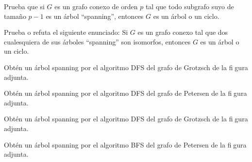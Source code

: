 \documentclass[twoside]{article}
\begin{document}
\newpage

\begin{ejercicio}{1.6}
Prueba que si $G$ es un grafo conexo de orden $p$ tal que todo subgrafo suyo de tamaño
$p -1$ es un árbol ``spanning'', entonces $G$ es un árbol o un ciclo.
\end{ejercicio}
\begin{solucion}
\end{solucion}

\newpage

\begin{ejercicio}{1.7}
Prueba o refuta el siguiente enunciado: Si $G$ es un grafo conexo tal que dos cualesquiera
de sus árboles ``spanning'' son isomorfos, entonces $G$ es un árbol o un ciclo.
\end{ejercicio}
\begin{solucion}

\end{solucion}

\newpage

\begin{ejercicio}{1.8}
Obtén un árbol spanning por el algoritmo DFS del grafo de Grotzsch de la figura adjunta.
\end{ejercicio}
\begin{solucion}





\end{solucion}
\newpage

\begin{ejercicio}{1.9}
Obtén un árbol spanning por el algoritmo DFS del grafo de Petersen de la figura adjunta.
\end{ejercicio}
\begin{solucion}

\end{solucion}
\newpage

\begin{ejercicio}{1.10}
Obtén un árbol spanning por el algoritmo DFS del grafo de Grotzsch de la figura adjunta.
\end{ejercicio}
\begin{solucion}

\end{solucion}

\newpage

\begin{ejercicio}{1.11}
Obtén un árbol spanning por el algoritmo BFS del grafo de Petersen de la figura adjunta.
\end{ejercicio}
\begin{solucion}



\end{solucion}
\end{document}
